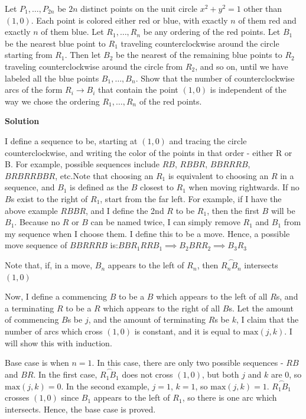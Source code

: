 \begin{enumerate}
 Let $P_1, \ldots, P_{2n}$ be $2n$ distinct points on the unit circle $x^2 + y^2 = 1$ other than $(1,0)$. Each point is colored either red or blue, with exactly $n$ of them red and exactly $n$ of them blue. Let $R_1, \ldots, R_n$ be any ordering of the red points. Let $B_1$ be the nearest blue point to $R_1$ traveling counterclockwise around the circle starting from $R_1$. Then let $B_2$ be the nearest of the remaining blue points to $R_2$ traveling counterclockwise around the circle from $R_2$, and so on, until we have labeled all the blue points $B_1, \ldots, B_n$. Show that the number of counterclockwise arcs of the form $R_i \rightarrow B_i$ that contain the point $(1,0)$ is independent of the way we chose the ordering $R_1, \ldots, R_n$ of the red points. 


 



\textbf{Solution}

I define a sequence to be, starting at $(1,0)$ and tracing the circle counterclockwise, and writing the color of the points in that order - either R or B. For example, possible sequences include $RB$, $RBBR$, $BBRRRB$, $BRBRRBBR$, etc.Note that choosing an $R_1$ is equivalent to choosing an $R$ in a sequence, and $B_1$ is defined as the $B$ closest to $R_1$ when moving rightwards. If no $B$s exist to the right of $R_1$, start from the far left. For example, if I have the above example $RBBR$, and I define the 2nd $R$ to be $R_1$, then the first $B$ will be $B_1$. Because no $R$ or $B$ can be named twice, I can simply remove $R_1$ and $B_1$ from my sequence when I choose them. I define this to be a move. Hence, a possible move sequence of $BBRRRB$ is:$BBR_1RRB_1\implies B_2BRR_2\implies B_3R_3$

 Note that, if, in a move, $B_n$ appears to the left of $R_n$, then $\stackrel{\frown}{R_nB_n}$ intersects $(1,0)$

 Now, I define a commencing $B$ to be a $B$ which appears to the left of all $R$s, and a terminating $R$ to be a $R$ which appears to the right of all $B$s. Let the amount of commencing $B$s be $j$, and the amount of terminating $R$s be $k$, I claim that the number of arcs which cross $(1,0)$ is constant, and it is equal to $\text{max}(j,k)$. I will show this with induction.

 Base case is when $n=1$. In this case, there are only two possible sequences - $RB$ and $BR$. In the first case, $\stackrel{\frown}{R_1B_1}$ does not cross $(1, 0)$, but both $j$ and $k$ are $0$, so $\text{max}(j,k)=0$. In the second example, $j=1$, $k=1$, so $\text{max}(j,k)=1$. $\stackrel{\frown}{R_1B_1}$ crosses $(1,0)$ since $B_1$ appears to the left of $R_1$, so there is one arc which intersects. Hence, the base case is proved.


\end{enumerate}
